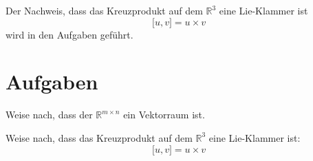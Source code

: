 Der Nachweis, dass das Kreuzprodukt auf dem $\mathbb{R}^3$ eine Lie-Klammer ist
\[
\lbrack u,v \rbrack = u \times v
\]
wird in den Aufgaben geführt. 

\section{Aufgaben}

\begin{prob}
\label{matrix.1}

Weise nach, dass der $\mathbb{R}^{m\times n}$ ein Vektorraum ist. 

\end{prob}

\begin{prob}
\label{lie}
Weise nach, dass das Kreuzprodukt auf dem $\mathbb{R}^3$ eine Lie-Klammer ist:
\[
\lbrack u,v \rbrack = u \times v
\]
\end{prob}

